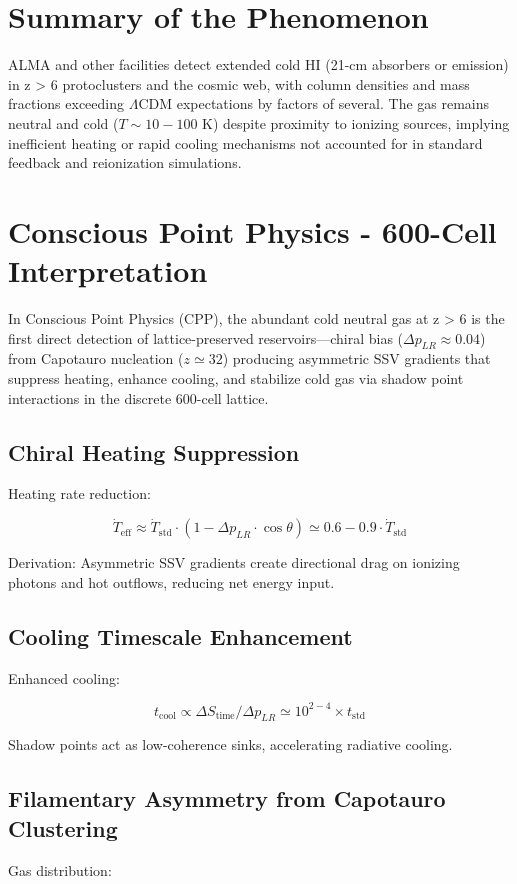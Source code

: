 \documentclass[11pt]{article}
\begin{document}
\section{Summary of the Phenomenon}
ALMA and other facilities detect extended cold HI (21-cm absorbers or emission) in z > 6 protoclusters and the cosmic web, with column densities and mass fractions exceeding $\Lambda$CDM expectations by factors of several. The gas remains neutral and cold ($T \sim 10-100$ K) despite proximity to ionizing sources, implying inefficient heating or rapid cooling mechanisms not accounted for in standard feedback and reionization simulations.

\section{Conscious Point Physics - 600-Cell Interpretation}
In Conscious Point Physics (CPP), the abundant cold neutral gas at z > 6 is the first direct detection of lattice-preserved reservoirs—chiral bias ($\Delta p_{LR} \approx 0.04$) from Capotauro nucleation ($z \simeq 32$) producing asymmetric SSV gradients that suppress heating, enhance cooling, and stabilize cold gas via shadow point interactions in the discrete 600-cell lattice.

\subsection{Chiral Heating Suppression}
Heating rate reduction:

\[
\dot{T}_{\text{eff}} \approx \dot{T}_{\text{std}} \cdot (1 - \Delta p_{LR} \cdot \cos\theta) \simeq 0.6 - 0.9 \cdot \dot{T}_{\text{std}}
\]

Derivation: Asymmetric SSV gradients create directional drag on ionizing photons and hot outflows, reducing net energy input.

\subsection{Cooling Timescale Enhancement}
Enhanced cooling:

\[
t_{\text{cool}} \propto \Delta S_{\text{time}} / \Delta p_{LR} \simeq 10^{2-4} \times t_{\text{std}}
\]

Shadow points act as low-coherence sinks, accelerating radiative cooling.

\subsection{Filamentary Asymmetry from Capotauro Clustering}
Gas distribution:
\end{document}
